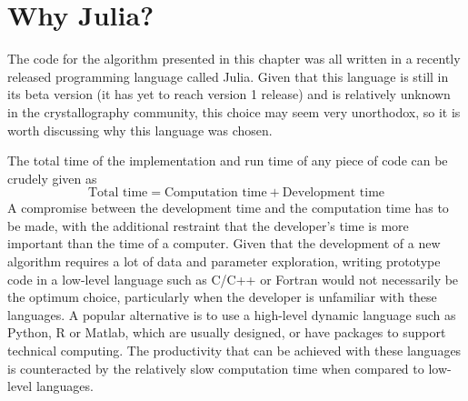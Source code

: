 \section{Why Julia?}
\label{sec:Why Julia?}
The code for the algorithm presented in this chapter was all written in a recently released programming language called Julia.
Given that this language is still in its beta version (it has yet to reach version 1 release) and is relatively unknown in the crystallography community, this choice may seem very unorthodox, so it is worth discussing why this language was chosen.

The total time of the implementation and run time of any piece of code can be crudely given as
\begin{equation*}
    \text{Total time} = \text{Computation time} + \text{Development time}
\end{equation*}
A compromise between the development time and the computation time has to be made, with the additional restraint that the developer's time is more important than the time of a computer.
Given that the development of a new algorithm requires a lot of data and parameter exploration, writing prototype code in a low-level language such as C/C++ or Fortran would not necessarily be the optimum choice, particularly when the developer is unfamiliar with these languages.
A popular alternative is to use a high-level dynamic language such as Python, R or Matlab, which are usually designed, or have packages to support technical computing.
The productivity that can be achieved with these languages is counteracted by the relatively slow computation time when compared to low-level languages.

